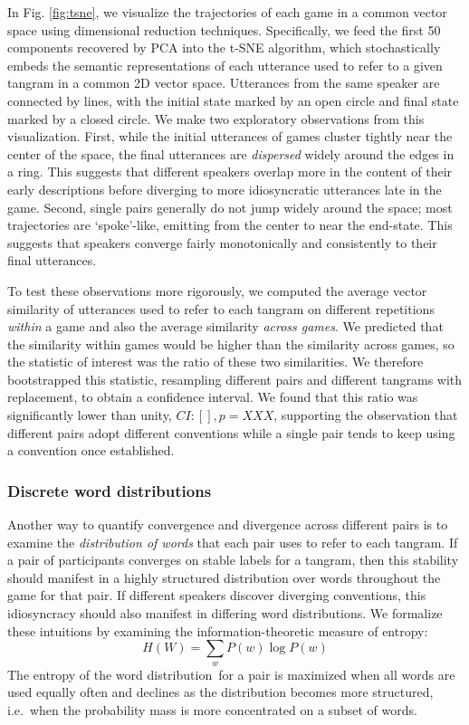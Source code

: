 \documentclass[alpha-refs]{wiley-article}
\begin{document}
In Fig. \ref{fig:tsne}, we visualize the trajectories of each game in a common vector space using dimensional reduction techniques.
Specifically, we feed the first 50 components recovered by PCA into the t-SNE algorithm, which stochastically embeds the semantic representations of each utterance used to refer to a given tangram in a common 2D vector space. 
Utterances from the same speaker are connected by lines, with the initial state marked by an open circle and final state marked by a closed circle.
We make two exploratory observations from this visualization.
First, while the initial utterances of games cluster tightly near the center of the space, the final utterances are \emph{dispersed} widely around the edges in a ring. 
This suggests that different speakers overlap more in the content of their early descriptions before diverging to more idiosyncratic utterances late in the game.
Second, single pairs generally do not jump widely around the space; most trajectories are `spoke'-like, emitting from the center to near the end-state.
This suggests that speakers converge fairly monotonically and consistently to their final utterances. 

To test these observations more rigorously, we computed the average vector similarity of utterances used to refer to each tangram on different repetitions \emph{within} a game and also the average similarity \emph{across games}. 
We predicted that the similarity within games would be higher than the similarity across games, so the statistic of interest was the ratio of these two similarities.
We therefore bootstrapped this statistic, resampling different pairs and different tangrams with replacement, to obtain a confidence interval. 
We found that this ratio was significantly lower than unity, $CI: [], p = XXX$, supporting the observation that different pairs adopt different conventions while a single pair tends to keep using a convention once established.


\subsubsection{Discrete word distributions}
Another way to quantify convergence and divergence across different pairs is to examine the \emph{distribution of words} that each pair uses to refer to each tangram.
If a pair of participants converges on stable labels for a tangram, then this stability should manifest in a highly structured distribution over words throughout the game for that pair.
If different speakers discover diverging conventions, this idiosyncracy should also manifest in differing word distributions.
We formalize these intuitions by examining the information-theoretic measure of entropy: $$H(W) = \sum_w P(w) \log P(w)$$
The entropy of the word distribution for a pair is maximized when all words are used equally often and declines as the distribution becomes more structured, i.e.~when the probability mass is more concentrated on a subset of words.
\end{document}
